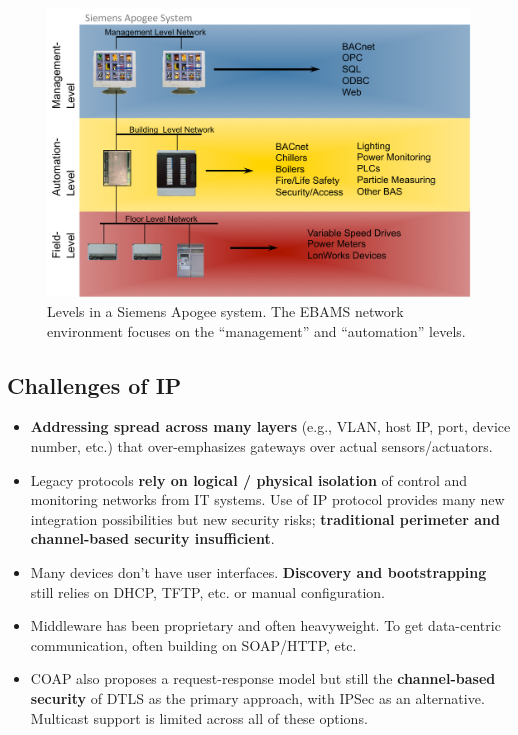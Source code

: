 \begin{figure}
\begin{center}
\vskip -12pt
\includegraphics[width=.6\textwidth]{figures/siemens-apogee-levels}
\vskip -5pt
\caption{{Levels in a Siemens Apogee system. The EBAMS network environment focuses on the ``management'' and ``automation'' levels.}}
\label{fig:apogee-levels}
\end{center}
\end{figure}

\subsection{Challenges of IP}

\begin{itemize}
\item \textbf{Addressing spread across many layers} (e.g., VLAN, host IP, port, device number, etc.) that over-emphasizes gateways over actual sensors/actuators.  
\item Legacy protocols \textbf{rely on logical / physical isolation} of control and monitoring networks from IT systems. Use of IP protocol provides many new integration possibilities but new security risks;  \textbf{traditional perimeter and channel-based security insufficient}. 
\item Many devices don’t have user interfaces. \textbf{Discovery and bootstrapping} still relies on DHCP, TFTP, etc. or manual configuration. 
\item Middleware has been proprietary and often heavyweight.  To get data-centric communication, often building on SOAP/HTTP, etc. 
\item COAP also proposes a request-response model but still the \textbf{channel-based security} of DTLS as the primary approach, with IPSec as an alternative.    Multicast support is limited across all of these options. 
\end{itemize}

